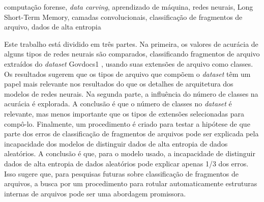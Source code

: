 \begin{resumo}{computação forense, \textit{data carving}, aprendizado de máquina, redes neurais, Long Short-Term Memory, camadas convolucionais, classificação de fragmentos de arquivo, dados de alta entropia}

Este trabalho está dividido em três partes.
Na primeira, os valores de acurácia de alguns tipos de redes neurais são comparados, classificando fragmentos de arquivo extraídos do \textit{dataset} Govdocs1 \cite{garfinkel_bringing_2009}, usando suas extensões de arquivo como classes.
Os resultados sugerem que os tipos de arquivo que compõem o \textit{dataset} têm um papel mais relevante nos resultados do que os detalhes de arquitetura dos modelos de redes neurais.
Na segunda parte, a influência do número de classes na acurácia é explorada.
A conclusão é que o número de classes no \textit{dataset} é relevante, mas menos importante que os tipos de extensões selecionadas para compô-lo.
Finalmente, um procedimento é criado para testar a hipótese de que parte dos erros de classificação de fragmentos de arquivos pode ser explicada pela incapacidade dos modelos de distinguir dados de alta entropia de dados aleatórios.
A conclusão é que, para o modelo usado, a incapacidade de distinguir dados de alta entropia de dados aleatórios pode explicar apenas 1/3 dos erros.
Isso sugere que, para pesquisas futuras sobre classificação de fragmentos de arquivos, a busca por um procedimento para rotular automaticamente estruturas internas de arquivos pode ser uma abordagem promissora.

\end{resumo}



